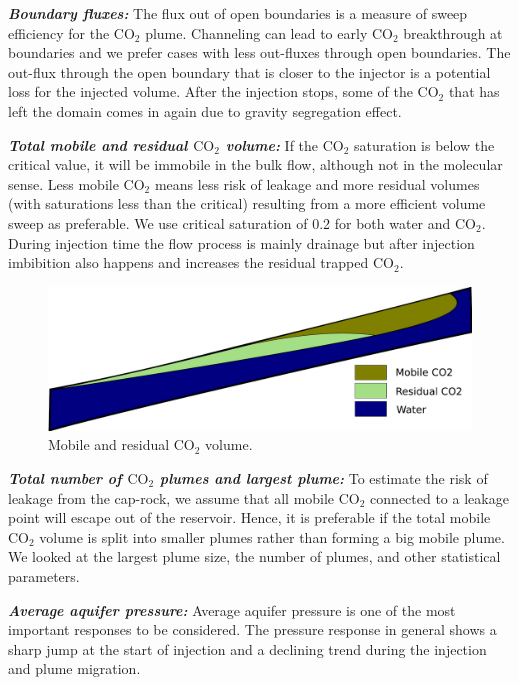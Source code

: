 \textbf{\textit{Boundary fluxes:}} The flux out of open boundaries is a measure
of sweep efficiency for the
CO$_2$ plume. Channeling can lead to early CO$_2$ breakthrough at boundaries and
we prefer cases with less out-fluxes through open boundaries. The out-flux
through the open boundary that is closer to the injector is a potential
loss for the injected volume. After the injection stops, some of the CO$_2$ that
has left the domain comes in again due to gravity segregation effect. 

\textbf{\textit{Total mobile and residual $\mbox{CO}_2$ volume:}}
If the CO$_2$ saturation is below the critical value, it will be immobile in the
bulk flow, although not in the molecular sense. Less mobile CO$_2$ means less
risk of leakage and more residual volumes (with saturations less than the
critical) resulting from a more efficient volume sweep as preferable. We use
critical saturation of 0.2 for both water and CO$_2$. During injection time the
flow process is mainly drainage but after injection imbibition also happens and
increases the residual trapped CO$_2$. 

\begin{figure}[thb]
  \centering
  \includegraphics[width=0.65 \linewidth]{./figurer/MobRes} 
  \caption{Mobile and residual CO$_2$ volume.}
  \label{fig:MobRes}
%
\end{figure}

\textbf{\textit{Total number of $\mbox{CO}_2$ plumes and largest plume:}} To
estimate the risk of leakage from the cap-rock, we assume that all mobile
CO$_2$ connected to a leakage point will escape out of the reservoir. Hence, it
is preferable if the total mobile CO$_2$ volume is split into smaller plumes
rather than forming a big mobile plume. We looked at the largest plume size, the number of
plumes, and other statistical parameters. 

% 

\textbf{\textit{Average aquifer pressure:}} Average aquifer pressure is one of
the most important responses to be
considered. The pressure response in general shows a sharp jump at the start of
injection and a declining trend during the injection and plume migration.  

